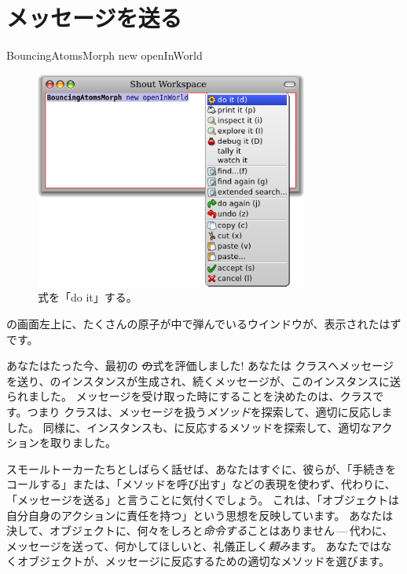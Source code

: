 \documentclass[a4paper,10pt,twoside]{book}
\begin{document}
\section{メッセージを送る}


\begin{code}{}
BouncingAtomsMorph new openInWorld
\end{code}


\begin{figure}[htb]
\centerline {\includegraphics[width=0.8\textwidth]{Doit}}
\caption{式を「do it」する。}
\end{figure}

\pharo の画面左上に、たくさんの原子が中で弾んでいるウインドウが、表示されたはずです。

あなたはたった今、最初の \st の式を評価しました!
あなたは \bam クラスへメッセージを送り、\bam のインスタンスが生成され、続くメッセージが、このインスタンスに送られました。
メッセージを受け取った時にすることを決めたのは、\bam クラスです。つまり \bam クラスは、メッセージを扱う\emph{メソッド}を探索して、適切に反応しました。
同様に、\bam インスタンスも、に反応するメソッドを探索して、適切なアクションを取りました。

スモールトーカーたちとしばらく話せば、あなたはすぐに、彼らが、「手続きをコールする」または、「メソッドを呼び出す」などの表現を使わず、代わりに、「メッセージを送る」と言うことに気付くでしょう。
これは、「オブジェクトは自分自身のアクションに責任を持つ」という思想を反映しています。
あなたは決して、オブジェクトに、何々をしろと\emph{命令する}ことはありません\,---\,代わに、メッセージを送って、何かしてほしいと、礼儀正しく\emph{頼み}ます。
あなたではなくオブジェクトが、メッセージに反応するための適切なメソッドを選びます。
\end{document}
